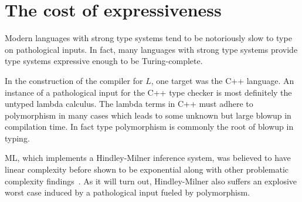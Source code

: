 \documentclass[11pt,oneside,a4paper]{report}
\begin{document}
\section{The cost of expressiveness}
Modern languages with strong type systems tend to be notoriously slow to type on pathological inputs.
In fact, many languages with strong type systems provide type systems expressive enough to be Turing-complete.

In the construction of the compiler for $L$, one target was the C++ language.
An instance of a pathological input for the C++ type checker is most definitely the untyped lambda calculus.
The lambda terms in C++ must adhere to polymorphism in many cases which leads to some unknown but large blowup in compilation time.
In fact type polymorphism is commonly the root of blowup in typing.

ML, which implements a Hindley-Milner inference system, was believed to have linear complexity before shown to be exponential along with other problematic complexity findings~\cite{mairson1989deciding}.
As it will turn out, Hindley-Milner also suffers an explosive worst case induced by a pathological input fueled by polymorphism.
\end{document}
